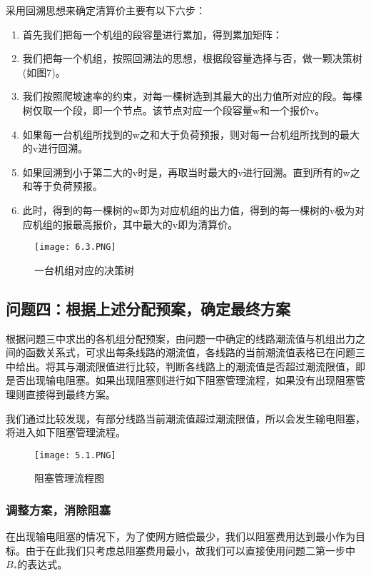 \documentclass[12pt,a4paper]{ctexart}
\begin{document}
	采用回溯思想来确定清算价主要有以下六步：\vspace{0.5em}
	\begin{enumerate}[第 1 步:]
		\item 首先我们把每一个机组的段容量进行累加，得到累加矩阵：
		
		\item 我们把每一个机组，按照回溯法的思想，根据段容量选择与否，做一颗决策树(如图7)。
		\item 我们按照爬坡速率的约束，对每一棵树选到其最大的出力值所对应的段。每棵树仅取一个段，即一个节点。该节点对应一个段容量w和一个报价v。 
		\item 如果每一台机组所找到的w之和大于负荷预报，则对每一台机组所找到的最大的v进行回溯。
		\item 如果回溯到小于第二大的v时是，再取当时最大的v进行回溯。直到所有的w之和等于负荷预报。
		\item 此时，得到的每一棵树的w即为对应机组的出力值，得到的每一棵树的v极为对应机组的报最高报价，其中最大的v即为清算价。\\
	\end{enumerate}

	\begin{figure}[!h]
		\centering	%
		\texttt{[image: 6.3.PNG]} %
		\caption{一台机组对应的决策树}
	\end{figure}
		
	\subsection{问题四：根据上述分配预案，确定最终方案}	
	根据问题三中求出的各机组分配预案，由问题一中确定的线路潮流值与机组出力之间的函数关系式，可求出每条线路的潮流值，各线路的当前潮流值表格已在问题三中给出。将其与潮流限值进行比较，判断各线路上的潮流值是否超过潮流限值，即是否出现输电阻塞。如果出现阻塞则进行如下阻塞管理流程，如果没有出现阻塞管理则直接得到最终方案。
	
	我们通过比较发现，有部分线路当前潮流值超过潮流限值，所以会发生输电阻塞，将进入如下阻塞管理流程。
	
	\begin{figure}[!h]
		\centering	%
		\texttt{[image: 5.1.PNG]} %
		\caption{阻塞管理流程图}
	\end{figure}
	
	\subsubsection*{调整方案，消除阻塞}
	在出现输电阻塞的情况下，为了使网方赔偿最少，我们以阻塞费用达到最小作为目标。由于在此我们只考虑总阻塞费用最小，故我们可以直接使用问题二第一步中$B_{*}$的表达式。
		
\end{document}
